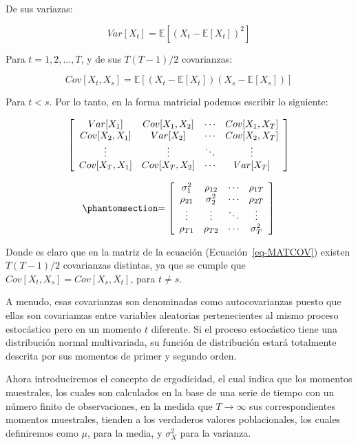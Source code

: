\documentclass[
  a4paper,
]{article}
\begin{document}
De sus variazas:

\[
Var[X_t] = \mathbb{E}[(X_t - \mathbb{E}[X_t])^2]
\]

Para \(t = 1, 2, \ldots, T\), y de sus \(T(T-1)/2\) covarianzas:

\[
Cov[X_t,X_s] = \mathbb{E}[(X_t - \mathbb{E}[X_t])(X_s - \mathbb{E}[X_s])]
\]

Para \(t < s\). Por lo tanto, en la forma matricial podemos escribir lo
siguiente:

\[
\left[
    \begin{array}{c c c c}
    Var[X_1] & Cov[X_1,X_2] & \cdots & Cov[X_1,X_T] \\
    Cov[X_2,X_1] & Var[X_2] & \cdots & Cov[X_2,X_T] \\
    \vdots & \vdots & \ddots & \vdots \\
    Cov[X_T,X_1] & Cov[X_T,X_2] & \cdots & Var[X_T] \\
    \end{array}
\right]
\]

\begin{equation}\phantomsection\label{eq-MATCOV}{
= \left[
    \begin{array}{c c c c}
    \sigma_1^2 & \rho_{12} & \cdots & \rho_{1T} \\
    \rho_{21} & \sigma_2^2 & \cdots & \rho_{2T} \\
    \vdots & \vdots & \ddots & \vdots \\
    \rho_{T1} & \rho_{T2} & \cdots & \sigma_T^2 \\
    \end{array}
\right]
}\end{equation}

Donde es claro que en la matriz de la ecuación
(Ecuación~\ref{eq-MATCOV}) existen \(T(T-1)/2\) covarianzas distintas,
ya que se cumple que \(Cov[X_t,X_s] = Cov[X_s,X_t]\), para \(t \neq s\).

A menudo, esas covarianzas son denominadas como autocovarianzas puesto
que ellas son covarianzas entre variables aleatorias pertenecientes al
mismo proceso estocástico pero en un momento \(t\) diferente. Si el
proceso estocástico tiene una distribución normal multivariada, su
función de distribución estará totalmente descrita por sus momentos de
primer y segundo orden.

Ahora introduciremos el concepto de ergodicidad, el cual indica que los
momentos muestrales, los cuales son calculados en la base de una serie
de tiempo con un número finito de observaciones, en la medida que
\(T \rightarrow \infty\) sus correspondientes momentos muestrales,
tienden a los verdaderos valores poblacionales, los cuales definiremos
como \(\mu\), para la media, y \(\sigma^2_X\) para la varianza.
\end{document}
